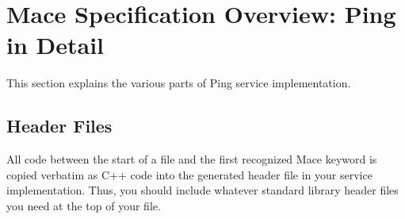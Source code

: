 % 
% 
% 
% 
% 
% 
\section{Mace Specification Overview: Ping in Detail}
\label{sec:firstping-detail}

This section explains the various parts of Ping service
implementation.

\subsection{Header Files}
\label{sec:header-files}

All code between the start of a \mac file and the first recognized
Mace keyword is copied verbatim as C++ code into the generated header
file in your service implementation.  Thus, you should include
whatever standard library header files you need at the top of your
\mac file.

